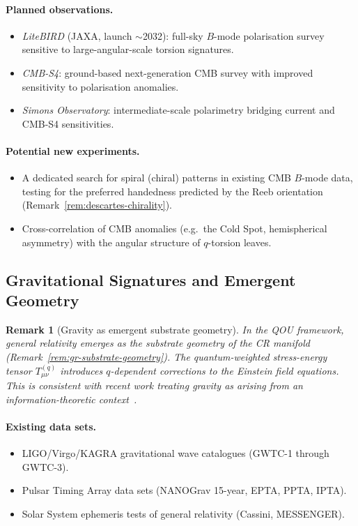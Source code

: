 \documentclass[12pt,a4paper]{report}
\newtheorem{remark}[theorem]{Remark}
\begin{document}
\paragraph{Planned observations.}
\begin{itemize}
  \item \emph{LiteBIRD} (JAXA, launch $\sim$2032): full-sky $B$-mode
        polarisation survey sensitive to large-angular-scale torsion
        signatures.
  \item \emph{CMB-S4}: ground-based next-generation CMB survey with
        improved sensitivity to polarisation anomalies.
  \item \emph{Simons Observatory}: intermediate-scale polarimetry bridging
        current and CMB-S4 sensitivities.
\end{itemize}

\paragraph{Potential new experiments.}
\begin{itemize}
  \item A dedicated search for spiral (chiral) patterns in existing CMB
        $B$-mode data, testing for the preferred handedness predicted by the
        Reeb orientation (Remark~\ref{rem:descartes-chirality}).
  \item Cross-correlation of CMB anomalies (e.g.\ the Cold Spot, hemispherical
        asymmetry) with the angular structure of $q$-torsion leaves.
\end{itemize}

\subsection{Gravitational Signatures and Emergent Geometry}
\label{sec:gravity-emergent}

\begin{remark}[Gravity as emergent substrate geometry]
\label{rem:gravity-emergent}
In the QOU framework, general relativity emerges as the substrate geometry of
the CR manifold (Remark~\ref{rem:gr-substrate-geometry}).  The quantum-weighted
stress-energy tensor $T_{\mu\nu}^{(q)}$ introduces $q$-dependent corrections
to the Einstein field equations.  This is consistent with recent work treating
gravity as arising from an information-theoretic context~\cite{carney2025}.
\end{remark}

\paragraph{Existing data sets.}
\begin{itemize}
  \item LIGO/Virgo/KAGRA gravitational wave catalogues (GWTC-1 through
        GWTC-3).
  \item Pulsar Timing Array data sets (NANOGrav 15-year, EPTA, PPTA,
        IPTA).
  \item Solar System ephemeris tests of general relativity (Cassini, MESSENGER).
\end{itemize}
\end{document}
